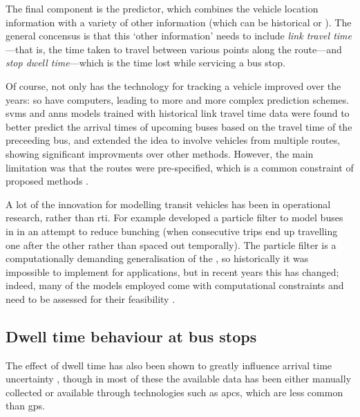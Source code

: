 The final component is the predictor, which combines the vehicle location information with a variety of other information (which can be historical or \rt{}). The general concensus is that this `other information' needs to include \emph{link travel time}---that is, the time taken to travel between various points along the route---and \emph{stop dwell time}---which is the time lost while servicing a bus stop.



Of course, not only has the technology for tracking a vehicle improved over the years: so have computers, leading to more and more complex prediction schemes. \Glspl{svm} \citep{Yu_2006,Yu_2010} and \glspl{ann} \citep{Mazloumi_2012,cn} models trained with historical link travel time data were found to better predict the arrival times of upcoming buses based on the travel time of the preceeding bus, and \citet{Yu_2011} extended the idea to involve vehicles from multiple routes, showing significant improvments over other methods. However, the main limitation was that the routes were pre-specified, which is a common constraint of proposed methods \citep{Chang_2010,Celan_2017,Celan_2018}.


A lot of the innovation for modelling transit vehicles has been in operational research, rather than \gls{rti}. For example \citet{Hans_2015} developed a particle filter to model buses in \rt{} in an attempt to reduce bunching (when consecutive trips end up travelling one after the other rather than spaced out temporally). The particle filter is a computationally demanding generalisation of the \kf{}, so historically it was impossible to implement for \rt{} applications, but in recent years this has changed; indeed, many of the \rt{} models employed come with computational constraints and need to be assessed for their feasibility \citep{Chang_2010,Cats_2016}.




\subsection{Dwell time behaviour at bus stops}
\label{sec:intro_dwell}

The effect of dwell time has also been shown to greatly influence arrival time uncertainty \citep{Jeong_2005,Meng_2013,Shen_2013,Robinson_2013,Gong_2013,Wang_2016}, though in most of these the available data has been either manually collected or available through technologies such as \glspl{apc}, which are less common than \gls{gps}.


